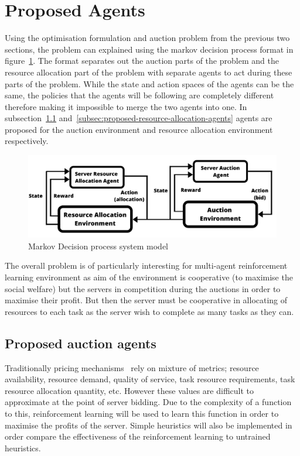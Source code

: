 \section{Proposed Agents}\label{sec:proposed-agents}
Using the optimisation formulation and auction problem from the previous two sections, the problem can explained
using the markov decision process format in figure~\ref{fig:mdp_system_model}. The format separates out the auction
parts of the problem and the resource allocation part of the problem with separate agents to act during these
parts of the problem. While the state and action spaces of the agents can be the same, the policies that the agents
will be following are completely different therefore making it impossible to merge the two agents into one.
In subsection~\ref{subsec:proposed-auction-agents} and~\ref{subsec:proposed-resource-allocation-agents} agents are
proposed for the auction environment and resource allocation environment respectively.

\begin{figure}
    \centering
    \includegraphics[width=14cm]{figures/flexible_resource_allocation_env.pdf}
    \caption{Markov Decision process system model}
    \label{fig:mdp_system_model}
\end{figure}

The overall problem is of particularly interesting for multi-agent reinforcement learning environment as aim of the
environment is cooperative (to maximise the social welfare) but the servers in competition during the auctions
in order to maximise their profit. But then the server must be cooperative in allocating of resources to each task
as the server wish to complete as many tasks as they can.

\subsection{Proposed auction agents}\label{subsec:proposed-auction-agents}
Traditionally pricing mechanisms~\citep{al2013cloud} rely on mixture of metrics; resource availability, resource demand,
quality of service, task resource requirements, task resource allocation quantity, etc. However these values are
difficult to approximate at the point of server bidding. Due to the complexity of a function to this, reinforcement
learning will be used to learn this function in order to maximise the profits of the server. Simple heuristics will
also be implemented in order compare the effectiveness of the reinforcement learning to untrained heuristics.

